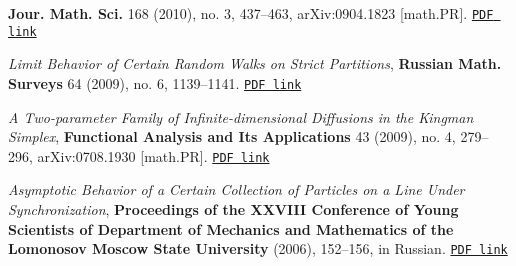 \documentclass[letterpaper,11pt]{article}
\begin{document}
\begin{etaremune}
				\textbf{Jour. Math. Sci.}
				168 (2010), no. 3, 437--463,
	      arXiv:0904.1823 [math.PR].
		\href{https://storage.lpetrov.cc/research_files/Petrov-publ/04-publ-petrov.pdf}{\texttt{PDF link}}
	\item
	      \emph{Limit Behavior of Certain Random Walks on Strict
		      Partitions},
					\textbf{Russian Math. Surveys} 64 (2009), no. 6, 1139--1141.
		\href{https://storage.lpetrov.cc/research_files/Petrov-publ/03-publ-petrov.pdf}{\texttt{PDF link}}
	\item
	      \emph{A Two-parameter Family of Infinite-dimensional Diffusions
		      in the Kingman Simplex}, \textbf{Functional Analysis and Its
					Applications} 43 (2009), no. 4, 279--296, arXiv:0708.1930
	      [math.PR].
		\href{https://storage.lpetrov.cc/research_files/Petrov-publ/02-publ-petrov.pdf}{\texttt{PDF link}}
	\item
	      \emph{Asymptotic Behavior of a Certain Collection of Particles
		      on a Line Under Synchronization}, \textbf{Proceedings of the XXVIII
	      Conference of Young Scientists of Department of Mechanics and
			Mathematics of the Lomonosov Moscow State University} (2006), 152--156, in
	      Russian.
		\href{https://storage.lpetrov.cc/research_files/Petrov-publ/01-publ-petrov-russian.pdf}{\texttt{PDF link}}
\end{etaremune}
\end{document}

